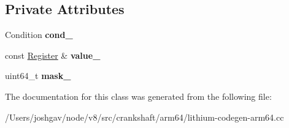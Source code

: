 \subsection*{Private Attributes}
\begin{DoxyCompactItemize}
\item 
Condition {\bfseries cond\+\_\+}\hypertarget{classv8_1_1internal_1_1_test_and_branch_ade827e0a053ae98adb8dbb63b528311d}{}\label{classv8_1_1internal_1_1_test_and_branch_ade827e0a053ae98adb8dbb63b528311d}

\item 
const \hyperlink{structv8_1_1internal_1_1_register}{Register} \& {\bfseries value\+\_\+}\hypertarget{classv8_1_1internal_1_1_test_and_branch_aa58733152abf1e9fb89e757b0c5f4eaa}{}\label{classv8_1_1internal_1_1_test_and_branch_aa58733152abf1e9fb89e757b0c5f4eaa}

\item 
uint64\+\_\+t {\bfseries mask\+\_\+}\hypertarget{classv8_1_1internal_1_1_test_and_branch_ace8fb8bdcc502666d57a2819849d490c}{}\label{classv8_1_1internal_1_1_test_and_branch_ace8fb8bdcc502666d57a2819849d490c}

\end{DoxyCompactItemize}


The documentation for this class was generated from the following file\+:\begin{DoxyCompactItemize}
\item 
/\+Users/joshgav/node/v8/src/crankshaft/arm64/lithium-\/codegen-\/arm64.\+cc\end{DoxyCompactItemize}
